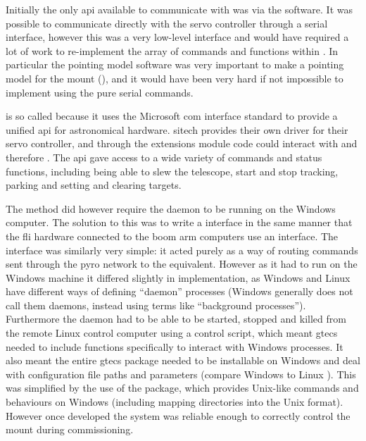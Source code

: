 \begin{colsection}
\begin{colsection}
Initially the only \gls{api} available to communicate with  was via the  software. It was possible to communicate directly with the servo controller through a serial interface, however this was a very low-level interface and would have required a lot of work to re-implement the array of commands and functions within . In particular the  pointing model software was very important to make a pointing model for the mount (), and it would have been very hard if not impossible to implement using the pure serial commands.

 is so called because it uses the Microsoft \gls{com} interface standard to provide a unified \gls{api} for astronomical hardware. \gls{sitech} provides their own  driver for their servo controller, and through the   extensions module  code could interact with  and therefore . The  \gls{api} gave access to a wide variety of commands and status functions, including being able to slew the telescope, start and stop tracking, parking and setting and clearing targets.

The  method did however require the  daemon to be running on the Windows computer. The solution to this was to write a  interface in the same manner that the \gls{fli} hardware connected to the boom arm computers use an  interface. The  interface was similarly very simple: it acted purely as a way of routing commands sent through the \gls{pyro} network to the  equivalent. However as it had to run on the Windows machine it differed slightly in implementation, as Windows and Linux have different ways of defining ``daemon'' processes (Windows generally does not call them daemons, instead using terms like ``background processes''). Furthermore the daemon had to be able to be started, stopped and killed from the remote Linux control computer using a  control script, which meant \gls{gtecs} needed to include functions specifically to interact with Windows processes. It also meant the entire \gls{gtecs} package needed to be installable on Windows and deal with configuration file paths and parameters (compare Windows  to Linux ). This was simplified by the use of the  package, which provides Unix-like commands and behaviours on Windows (including mapping directories into the Unix format). However once developed the system was reliable enough to correctly control the mount during commissioning.


\end{colsection}
\end{colsection}
